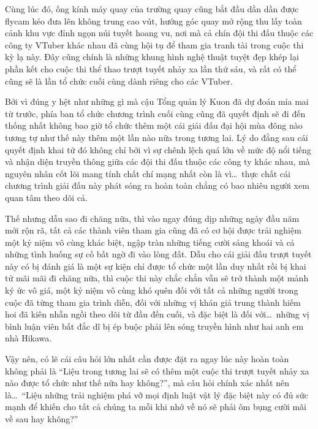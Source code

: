 \documentclass[../main.tex]{subfiles}
\begin{document}
Cùng lúc đó, ống kính máy quay của trường quay cũng bắt đầu dần dần được flycam kéo đưa lên không trung cao vút, hướng góc quay mở rộng thu lấy toàn cảnh khu vực đỉnh ngọn núi tuyết hoang vu, nơi mà cả chín đội thi đấu thuộc các công ty VTuber khác nhau đã cùng hội tụ để tham gia tranh tài trong cuộc thi kỳ lạ này. Đây cũng chính là những khung hình nghệ thuật tuyệt đẹp khép lại phần kết cho cuộc thi thể thao trượt tuyết nhảy xa lần thứ sáu, và rất có thể cũng sẽ là lần tổ chức cuối cùng dành riêng cho các VTuber.

Bởi vì đúng y hệt như những gì mà cậu Tổng quản lý Kuon đã dự đoán mỉa mai từ trước, phía ban tổ chức chương trình cuối cùng cũng đã quyết định sẽ đi đến thống nhất không bao giờ tổ chức thêm một cái giải đấu đại hội mùa đông nào tương tự như thế này thêm một lần nào nữa trong tương lai. Lý do đằng sau cái quyết định khai tử đó không chỉ bởi vì sự chênh lệch quá lớn về mức độ nổi tiếng và nhận diện truyền thông giữa các đội thi đấu thuộc các công ty khác nhau, mà nguyên nhân cốt lõi mang tính chất chí mạng nhất còn là vì\dots\ thực chất cái chương trình giải đấu này phát sóng ra hoàn toàn chẳng có bao nhiêu người xem quan tâm theo dõi cả.

Thế nhưng dẫu sao đi chăng nữa, thì vào ngay đúng dịp những ngày đầu năm mới rộn rã, tất cả các thành viên tham gia cũng đã có cơ hội được trải nghiệm một kỷ niệm vô cùng khác biệt, ngập tràn những tiếng cười sảng khoái và cả những tình huống sự cố bất ngờ đi vào lòng đất. Dẫu cho cái giải đấu trượt tuyết này có bị đánh giá là một sự kiện chỉ được tổ chức một lần duy nhất rồi bị khai tử mãi mãi đi chăng nữa, thì cuộc thi này chắc chắn vẫn sẽ trở thành một mảnh ký ức vô giá, một kỷ niệm vô cùng khó quên đối với tất cả những người trong cuộc đã từng tham gia trình diễn, đối với những vị khán giả trung thành hiếm hoi đã kiên nhẫn ngồi theo dõi từ đầu đến cuối, và đặc biệt là đối với\dots\ những vị bình luận viên bất đắc dĩ bị ép buộc phải lên sóng truyền hình như hai anh em nhà Hikawa.

Vậy nên, có lẽ cái câu hỏi lớn nhất cần được đặt ra ngay lúc này hoàn toàn không phải là ``Liệu trong tương lai sẽ có thêm một cuộc thi trượt tuyết nhảy xa nào được tổ chức như thế nữa hay không?'', mà câu hỏi chính xác nhất nên là\dots\ ``Liệu những trải nghiệm phá vỡ mọi định luật vật lý đặc biệt này có đủ sức mạnh để khiến cho tất cả chúng ta mỗi khi nhớ về nó sẽ phải ôm bụng cười mãi về sau hay không?''
\end{document}
